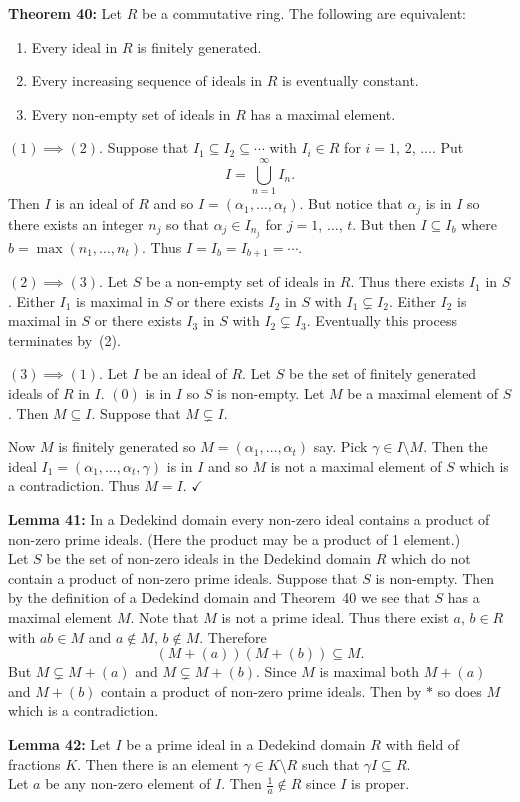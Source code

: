 \textbf{Theorem 40:} Let $R$ be a commutative ring.  The following are equivalent:
\begin{enumerate}
\item Every ideal in $R$ is finitely generated.
\item Every increasing sequence of ideals in $R$ is eventually constant.
\item Every non-empty set of ideals in $R$ has a maximal element.
\end{enumerate}
\pf $(1)\implies(2)$. Suppose that $I_1\subseteq I_2\subseteq\dotsb$ with $I_i\in R$ for $i=1$, $2$, $\dotsc$.  Put
\[ I = \bigcup_{n=1}^\infty I_n . \]
Then $I$ is an ideal of $R$ and so $I=(\alpha_1,\dotsc,\alpha_t)$.  But notice that $\alpha_j$ is in $I$ so there exists an integer $n_j$ so that $\alpha_j\in I_{n_j}$ for $j=1$, $\dotsc$, $t$.  But then $I\subseteq I_b$ where $b=\max(n_1,\dotsc,n_t)$.  Thus $I=I_b=I_{b+1}=\dotsb$.

$(2)\implies(3)$. Let $S$ be a non-empty set of ideals in $R$.  Thus there exists $I_1$ in $S$.  Either $I_1$ is maximal in $S$ or there exists $I_2$ in $S$ with $I_1\subsetneq I_2$.  Either $I_2$ is maximal in $S$ or there exists $I_3$ in $S$ with $I_2\subsetneq I_3$.  Eventually this process terminates by~(2).

$(3)\implies(1)$. Let $I$ be an ideal of $R$.  Let $S$ be the set of finitely generated ideals of $R$ in $I$.  $(0)$ is in $I$ so $S$ is non-empty.  Let $M$ be a maximal element of $S$.  Then $M\subseteq I$.  Suppose that $M\subsetneq I$.

Now $M$ is finitely generated so $M=(\alpha_1,\dotsc,\alpha_t)$ say.  Pick $\gamma\in I\setminus M$.  Then the ideal $I_1=(\alpha_1,\dotsc,\alpha_t,\gamma)$ is in $I$ and so $M$ is not a maximal element of $S$ which is a contradiction.  Thus $M=I$. $\checkmark$

\textbf{Lemma 41:} In a Dedekind domain every non-zero ideal contains a product of non-zero prime ideals.  (Here the product may be a product of 1 element.) \\
\pf Let $S$ be the set of non-zero ideals in the Dedekind domain $R$ which do not contain a product of non-zero prime ideals.  Suppose that $S$ is non-empty.  Then by the definition of a Dedekind domain and Theorem~40 we see that $S$ has a maximal element $M$.  Note that $M$ is not a prime ideal.  Thus there exist $a$, $b\in R$ with $ab\in M$ and $a\notin M$, $b\notin M$.  Therefore
\[ (M+(a))(M+(b)) \subseteq M . \]
But $M\subsetneq M+(a)$ and $M\subsetneq M+(b)$.  Since $M$ is maximal both $M+(a)$ and $M+(b)$ contain a product of non-zero prime ideals.  Then by $*$ so does $M$ which is a contradiction.

\textbf{Lemma 42:} Let $I$ be a prime ideal in a Dedekind domain $R$ with field of fractions $K$.  Then there is an element $\gamma\in K\setminus R$ such that $\gamma I\subseteq R$. \\
\pf Let $a$ be any non-zero element of $I$.  Then $\frac{1}{a}\notin R$ since $I$ is proper.